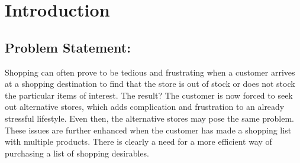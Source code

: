 \documentclass[10pt, a4paper, twocolumn]{scrartcl}
\begin{document}
%		
%		
%
%		
%		
%		

\onecolumn
\section{Introduction}

	\subsection{Problem Statement:} 
	
		Shopping can often prove to be tedious and frustrating when a customer arrives at a shopping destination to find that the store is out of stock or does not stock the particular items of interest. The result? The customer is now forced to seek out alternative stores, which adds complication and frustration to an already stressful lifestyle. Even then, the alternative stores may pose the same problem. These issues are further enhanced when the customer has made a shopping list with multiple products. There is clearly a need for a more efficient way of purchasing a list of shopping desirables. \\
		
\end{document}
